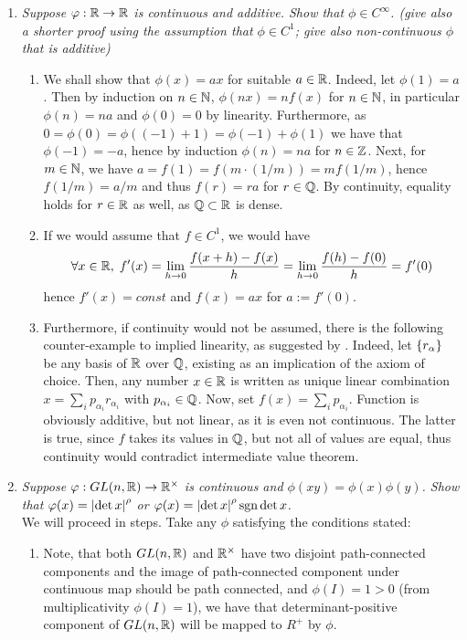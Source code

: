 \documentclass[10pt]{article} %
\newcommand{\sgn}{\mbox{\normalfont{sgn}}}
\begin{document}
\begin{enumerate}[1. ]
\item\textit{Suppose $\varphi:\mathbb{R}\to{\mathbb{R}}$ is continuous and additive. Show that $\phi\in C^\infty$. (give also a shorter proof
using the assumption that $\phi\in C^1$; give also non-continuous $\phi$ that is additive)}
\begin{enumerate}
\item We shall show that $\phi(x)=ax$ for suitable $a\in\mathbb{R}$. Indeed, let $\phi(1)=a$. Then by induction on $n\in\mathbb{N}$, $\phi(nx)=nf(x)$ for $n\in\mathbb{N}$,
in particular $\phi(n)=na$ and $\phi(0)=0$
by linearity. Furthermore, as $0=\phi(0)=\phi((-1)+1)=\phi(-1)+\phi(1)$ we have that $\phi(-1)=-a$, hence by induction $\phi(n)=na$ for $n\in\mathbb{Z}$.
Next, for $m\in\mathbb{N}$, we have $a=f(1)=f(m\cdot(1/m))=mf(1/m)$, hence $f(1/m)=a/m$ and thus $f(r)=ra$ for $r\in\mathbb{Q}$. By continuity, equality holds
for $r\in\mathbb{R}$ as well, as $\mathbb{Q}\subset\mathbb{R}$ is dense.
\item If we would assume that $f\in C^1$, we would have
\[\forall x\in\R,\;f'(x)=\lim_{h\to0}\frac{f(x+h)-f(x)}{h}=\lim_{h\to0}\frac{f(h)-f(0)}{h}=f'(0)\]
hence $f'(x)=const$ and $f(x)=ax$ for $a:=f'(0)$.
\item Furthermore, if continuity would not be assumed, there is the following counter-example to implied linearity, as suggested by \cite{gelbaum}.
Indeed, let $\left\{r_\alpha\right\}$ be any basis of $\mathbb{R}$ over $\mathbb{Q}$, existing as an implication of the axiom of choice. 
Then, any number $x\in\mathbb{R}$ is written as unique linear combination $x=\sum_ip_{\alpha_i}r_{\alpha
_i}$ with $p_{\alpha_i}\in\mathbb{Q}$. Now, set
$f(x)=\sum_ip_{\alpha_i}$. Function is obviously additive, but not linear, as it is even not continuous. The latter is true, since $f$ takes
its values in $\mathbb{Q}$, but not all of values are equal, thus continuity would contradict intermediate value theorem.
\end{enumerate}
\item\textit{Suppose $\varphi:GL(n,\mathbb{R})\to\mathbb{R}^\times$ is continuous and $\phi(xy)=\phi(x)\phi(y)$. Show that $\varphi(x)=\left|\det x\right|^\rho$ or
$\phi(x)=\myabs{\det x}^\rho\sgn\det x$.}\\We will proceed in steps. Take any $\phi$ satisfying the conditions stated:
\begin{enumerate}[1$^\circ$]
\item Note, that both $GL(n,\mathbb{R})$ and $\mathbb{R}^\times$ have two disjoint path-connected components and the image of path-connected component
under continuous map should be path connected, and $\phi(I)=1>0$ (from multiplicativity $\phi(I)=1$), we have that determinant-positive component
of $GL(n,\mathbb{R})$ will be mapped to $R^+$ by $\phi$.


\end{enumerate}
\end{enumerate}
\end{document}
